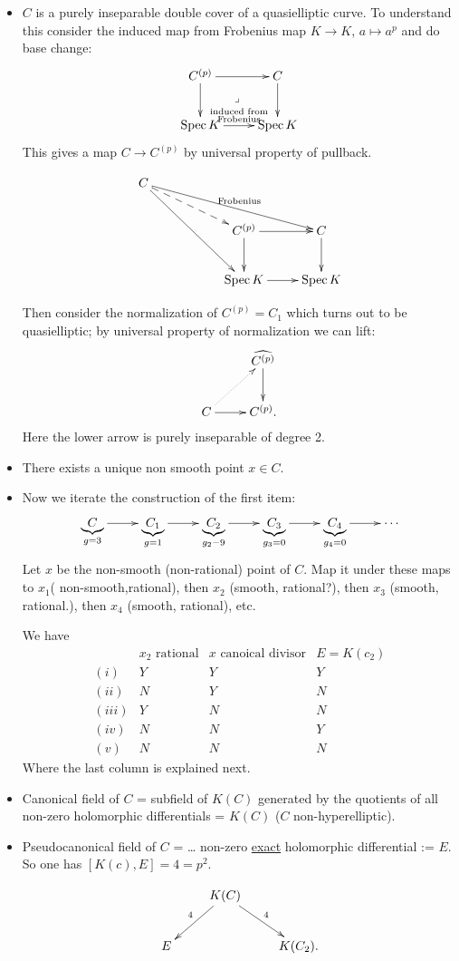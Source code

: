 \begin{itemize}
\item $C$ is a purely inseparable double cover of a quasielliptic curve.
To understand this consider the induced map from
Frobenius map $K \to K$, $a \mapsto a^p$ and do base change:
$$
\xymatrix{
C^{(p)}\ar[r]\ar[d]\ar@{}[dr]|-{\lrcorner}&C\ar[d]\\
\Spec K\ar[r]^{\substack{\text{induced from} \\ \text{Frobenius}}}&\Spec K
}
$$
This gives a map $C \to C^{(p)}$ by universal property of pullback.

$$
\xymatrix{
C \ar[rrrd]^{\text{Frobenius}} \ar@{-->}[rrd]\ar[rrdd] & & \\
& &  C^{(p)}\ar[d] \ar[r] & C \ar[d] \\
& &  \Spec K\ar[r] & \Spec K
}
$$

Then consider the normalization of $C^{(p)}=C_1$ which
turns out to be quasielliptic; by universal
property of normalization we can lift:
$$
\xymatrix{
& \widehat{C^{(p)}}\ar[d]\\
C\ar@{.>}[ur]\ar[r]&C^{(p)}.
}
$$
Here the lower arrow is purely inseparable of degree 2.

\item There exists a unique non smooth point $x \in C$.

\item Now we iterate the construction of the first item:
$$
\xymatrix{
\underbrace{C}_{g=3}\ar[r]&\underbrace{C_1}_{g=1}\ar[r]&
\underbrace{C_2}_{g_2-9}\ar[r]&\underbrace{C_3}_{g_3=0}\ar[r]&
\underbrace{C_4}_{g_4=0}\ar[r]&\cdots
}
$$
Let $x$ be the non-smooth (non-rational) point of $C$. Map it under
these maps to $x_1$( non-smooth,rational), then  $x_2$ (smooth, rational?),
then $x_3 $ (smooth, rational.), then $x_4$ (smooth, rational), etc.

We have
$$
\begin{matrix}
&\text{$x_2$ rational}& \text{$x$ canoical divisor} & 
E=K(c_2)\\
(i)& Y & Y & Y\\
(ii) & N & Y & N\\
(iii) & Y & N & N\\
(iv) & N & N & Y\\
(v) & N & N & N
\end{matrix}
$$
Where the last column is explained next.

\item Canonical field of $C$ = subfield of $K(C)$ generated
by the quotients of all non-zero holomorphic differentials
=  $K(C)$ ($C$ non-hyperelliptic).

\item Pseudocanonical field of $C$ = … non-zero \underline{exact}
holomorphic differential := $E$. So one has $[K(c),E]=4=p^2$.

$$
\xymatrix{
&K(C)\ar[ld]_{4}\ar[rd]^{4}\\
E&&K(C_2).
}
$$
\end{itemize}

